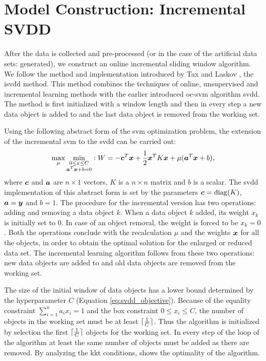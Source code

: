 \section{Model Construction: Incremental SVDD}\label{sec:method_model_construction}
After the data is collected and pre-processed (or in the case of the artificial data sets: generated), we construct an online incremental sliding window algorithm.
We follow the method and implementation introduced by Tax and Laskov \cite{tax2003online}, the \acrlong{isvdd} method.
This method combines the techniques of online, unsupervised and incremental learning methods with the earlier introduced \gls{oc-svm} algorithm \gls{svdd}.
The method is first initialized with a window length and then in every step a new data object is added to and the last data object is removed from the working set.

Using the following abstract form of the \gls{svm} optimization problem, the extension of the incremental \gls{svm} to the \gls{svdd} can be carried out:
\begin{equation}
  \operatorname*{max}_\mu \operatorname*{min}_{\substack{
    0 \le x \le C \\
    \vectorsym{a}^T \vectorsym{x} + b = 0}
  } : W = -\vectorsym{c}^T\vectorsym{x} + \frac{1}{2}\vectorsym{x}^T K\vectorsym{x} + \mu(\vectorsym{a}^T\vectorsym{x} + b),
\end{equation}
where $\vectorsym{c}$ and $\vectorsym{a}$ are $n \times 1$ vectors, $K$ is a $n \times n$ matrix and $b$ is a scalar.
The \gls{svdd} implementation of this abstract form is set by the parameters $\vectorsym{c}=\operatorname*{diag}(K)$, $\vectorsym{a} = \vectorsym{y}$ and $b=1$.
The procedure for the incremental version has two operations: adding and removing a data object $k$.
When a data object $k$ added, its weight $x_k$ is initially set to $0$.
In case of an object removal, the weight is forced to be $x_k=0$.
Both the operations conclude with the recalculation $\mu$ and the weights $\vectorsym{x}$ for all the objects, in order to obtain the optimal solution for the enlarged or reduced data set.
The incremental learning algorithm follows from these two operations: new data objects are added to and old data objects are removed from the working set.

The size of the initial window of data objects has a lower bound determined by the hyperparameter $C$ (Equation \ref{eq:svdd_objective}).
Because of the equality constraint $\sum_{i=1}^n a_i x_i = 1$ and the box constraint $0 \le x_i \le C$, the number of objects in the working set must be at least $\lceil\frac{1}{C}\rceil$.
Thus the algorithm is initialized by selection the first $\lceil\frac{1}{C}\rceil$ objects for the working set.
In every step of the loop of the algorithm at least the same number of objects must be added as there are removed.
By analyzing the \gls{kkt} conditions, \cite{tax2003online} shows the optimality of the algorithm.

